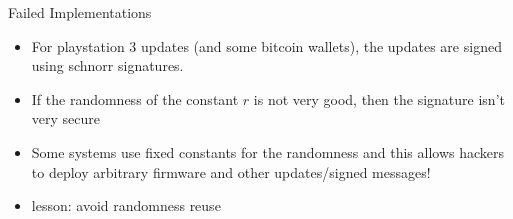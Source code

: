 \documentclass[handout]{beamer}
\begin{document}
\begin{frame}{Failed Implementations}
    \begin{itemize}
        \item \pause For playstation 3 updates (and some bitcoin wallets), the updates are signed using schnorr signatures.
        \item \pause If the randomness of the constant \(r\) is not very good, then the signature isn't very secure
        \item \pause Some systems use fixed constants for the randomness and this allows hackers to deploy arbitrary firmware and other updates/signed messages!
        \item \pause lesson: avoid randomness reuse
    \end{itemize}
    
\end{frame}
\end{document}
